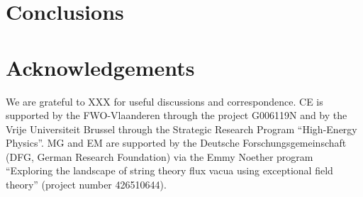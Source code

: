 \documentclass[a4paper, 11pt]{article}
\numberwithin{equation}{section}
\newcommand{\+}{\oplus}
\begin{document}
\section{Conclusions} \label{s:Conclusions}

\section*{Acknowledgements}
We are grateful to XXX for useful discussions and correspondence. CE is supported by the FWO-Vlaanderen through the project G006119N and by the Vrije Universiteit Brussel through the Strategic Research Program ``High-Energy Physics''. MG and EM are supported by the Deutsche Forschungsgemeinschaft (DFG, German Research Foundation) via the Emmy Noether program ``Exploring the landscape of string theory flux vacua using exceptional field theory'' (project number 426510644).
	


	
\end{document}

